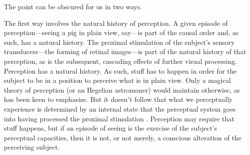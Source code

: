 \documentclass[12pt]{article}
\begin{document}
The point can be obscured for us in two ways.

The first way involves the natural history of perception. A given episode of perception---seeing a pig in plain view, say---is part of the causal order and, as such, has a natural history. The proximal stimulation of the subject's sensory transducers---the forming of retinal images---is part of the natural history of that perception, as is the subsequent, cascading effects of further visual processing. Perception has a natural history. As such, stuff has to happen in order for the subject to be in a position to perceive what is in plain view. Only a magical theory of perception (or an Hegelian astromoner) would maintain otherwise, as \citet{Burge:2005uq} has been keen to emphasize. But it doesn't follow that what we perceptually experience is determined by an internal state that the perceptual system goes into having processed the proximal stimulation \citep[see][]{Campbell:2010uq,McDowell:2010fk,Travis:2011os}. Perception may require that stuff happens, but if an episode of seeing is the exercise of the subject's perceptual capacities, then it is not, or not merely, a conscious alteration of the perceiving subject.
\end{document}
